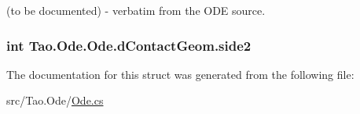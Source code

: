 (to be documented) -\/ verbatim from the ODE source. 

\hypertarget{struct_tao_1_1_ode_1_1_ode_1_1d_contact_geom_aac6ad362745afd88a6408a4565bd4c7a}{
\subsubsection[{side2}]{\setlength{\rightskip}{0pt plus 5cm}int {\bf Tao.Ode.Ode.dContactGeom.side2}}}
\label{struct_tao_1_1_ode_1_1_ode_1_1d_contact_geom_aac6ad362745afd88a6408a4565bd4c7a}


The documentation for this struct was generated from the following file:\begin{DoxyCompactItemize}
\item 
src/Tao.Ode/\hyperlink{_ode_8cs}{Ode.cs}\end{DoxyCompactItemize}
